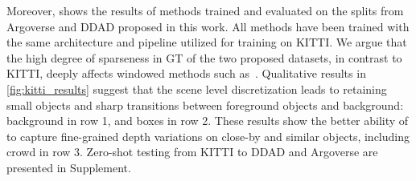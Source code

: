 Moreover,  shows the results of methods trained and evaluated on the splits from Argoverse and DDAD proposed in this work. All methods have been trained with the same architecture and pipeline utilized for training on KITTI. We argue that the high degree of sparseness in GT of the two proposed datasets, in contrast to KITTI, deeply affects windowed methods such as~\cite{Bhat2020, Yuan2022}. Qualitative results in \cref{fig:kitti_results} suggest that the scene level discretization leads to retaining small objects and sharp transitions between foreground objects and background: background in row 1, and boxes in row 2. These results show the better ability of \ourmodel to capture fine-grained depth variations on close-by and similar objects, including crowd in row 3. Zero-shot testing from KITTI to DDAD and Argoverse are presented in Supplement.


\begin{table}[]
    \centering
    \caption{\textbf{Comparison on Argoverse and DDAD proposed splits.} Comparison of performance of methods trained on either Argoverse or DDAD and tested on the same dataset.}
    \vspace{-10pt}
    \label{tab:ddad_argo_results}
    \vspace{-10pt}
\end{table}


